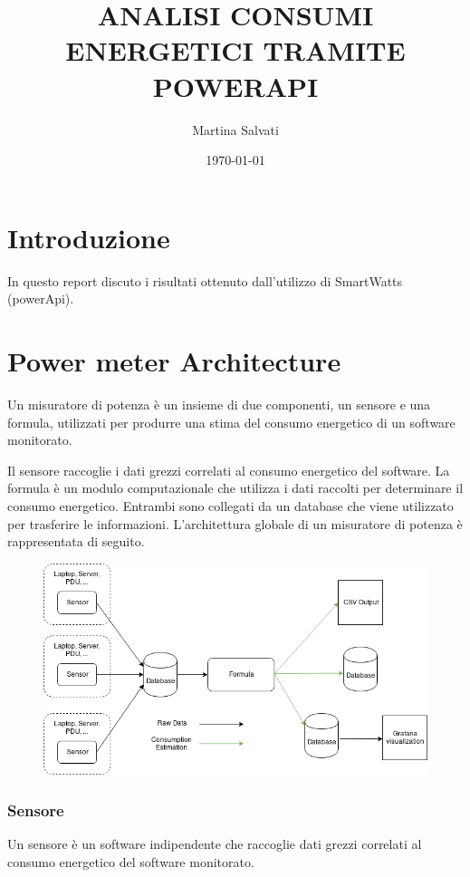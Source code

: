 \documentclass[a4paper, 11pt]{article}
\author{Martina Salvati}
\title{ANALISI CONSUMI ENERGETICI TRAMITE POWERAPI}
\date{\today} %
\begin{document}
\maketitle
\tableofcontents

\section{Introduzione}

In questo report discuto i risultati ottenuto dall'utilizzo di SmartWatts (powerApi).

\pagebreak

\section{Power meter Architecture}
Un misuratore di potenza è un insieme di due componenti, un sensore e una formula, utilizzati per produrre una stima del consumo energetico di un software monitorato.

Il sensore raccoglie i dati grezzi correlati al consumo energetico del software. La formula è un modulo computazionale che utilizza i dati raccolti per determinare il consumo energetico. Entrambi sono collegati da un database che viene utilizzato per trasferire le informazioni. L'architettura globale di un misuratore di potenza è rappresentata di seguito.

\begin{figure}[h]
\centering
\includegraphics[scale=0.65]{powerAPI_archi}
\centering
\end{figure}
\pagebreak
\subsubsection{Sensore}
Un sensore è un software indipendente che raccoglie dati grezzi correlati al consumo energetico del software monitorato.
\end{document}
